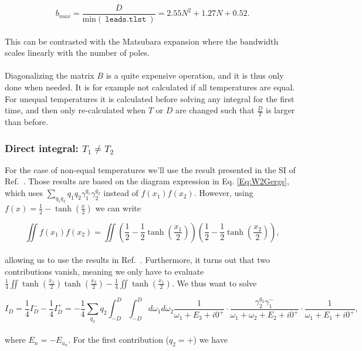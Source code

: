 \documentclass{article}
\begin{document}
\begin{equation}
    b_{max} = \frac{D}{\text{min}(\ \texttt{leads.tlst}\ )}= 2.55N^{2} + 1.27N + 0.52.
\end{equation}
\\
This can be contrasted with the Matsubara expansion where the bandwidth scales linearly with the number of poles.
\\
\\
Diagonalizing the matrix $B$ is a quite expensive operation, and it is thus only done when needed. It is for example not calculated if all temperatures are equal. For unequal temperatures it is calculated before solving any integral for the first time, and then only re-calculated when $T$ or $D$ are changed such that $\frac{D}{T}$ is larger than before.
\subsubsection{Direct integral: $T_1\ne T_2$}

For the case of non-equal temperatures we'll use the result presented in the SI of Ref.~\cite{gergs2018spin}. Those results are based on the diagram expression in Eq. \ref{Eq:W2Gergs}, which uses $\sum_{q_1q_2}q_1q_2\gamma^{q_1}_1\gamma^{q_2}_2$ instead of $f(x_1)f(x_2)$. However, using $f(x)=\frac{1}{2}-\tanh\left(\frac{x}{2}\right)$ we can write

\begin{equation}
    \iint f(x_1)f(x_2) = \iint \left(\frac{1}{2}-\frac{1}{2}\tanh\left(\frac{x_1}{2}\right)\right)\left(\frac{1}{2}-\frac{1}{2}\tanh\left(\frac{x_2}{2}\right)\right),
\end{equation}
\\
allowing us to use the results in Ref.~\cite{gergs2018spin}. Furthermore, it turns out that two contributions vanish, meaning we only have to evaluate $\frac{1}{4}\iint \tanh\left(\frac{x_1}{2}\right)\tanh\left(\frac{x_2}{2}\right) - \frac{1}{4}\iint\tanh\left(\frac{x_1}{2}\right)$. We thus want to solve 

\begin{equation}
    I_D = \frac{1}{4}I_D^--\frac{1}{4}I_D^+ = -\frac{1}{4}\sum_{q_2}q_2 \int_{-D}^D\int_{-D}^Dd\omega_1d\omega_2\frac{1}{\omega_1+E_3+ i0^+}\cdot\frac{\gamma^{q_2}_2\gamma^{-}_1}{\omega_1 + \omega_2 + E_2 + i0^+}\cdot\frac{1}{\omega_1+E_1+i0^+},
\end{equation}
\\
where $E_n= -E_{a_n}$. For the first contribution ($q_2=+$) we have
\end{document}
